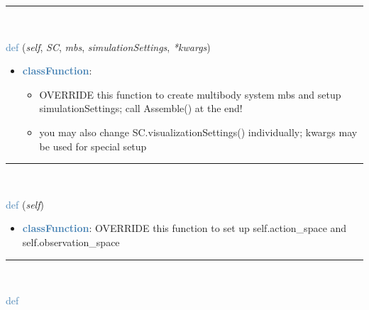 \begin{itemize}[leftmargin=1.4cm]
\begin{itemize}[leftmargin=1.4cm]
%
\noindent\rule{8cm}{0.75pt}\vspace{1pt} \\ 
\begin{flushleft}
\noindent \textcolor{steelblue}{def {\bf {}}}\label{sec:artificialIntelligence:OpenAIGymInterfaceEnv(Env):CreateMBS}
({\it self}, {\it SC}, {\it mbs}, {\it simulationSettings}, {\it **kwargs})
\end{flushleft}
\setlength{\itemindent}{0.7cm}
\begin{itemize}[leftmargin=0.7cm]
\item[--]\textcolor{steelblue}{\bf classFunction}: \vspace{-6pt}
\begin{itemize}[leftmargin=1.2cm]
\setlength{\itemindent}{-0.7cm}
\item[]OVERRIDE this function to create multibody system mbs and setup simulationSettings; call Assemble() at the end!
\item[]you may also change SC.visualizationSettings() individually; kwargs may be used for special setup
\end{itemize}
\vspace{12pt}\end{itemize}
%
\noindent\rule{8cm}{0.75pt}\vspace{1pt} \\ 
\begin{flushleft}
\noindent \textcolor{steelblue}{def {\bf {}}}\label{sec:artificialIntelligence:OpenAIGymInterfaceEnv(Env):SetupSpaces}
({\it self})
\end{flushleft}
\setlength{\itemindent}{0.7cm}
\begin{itemize}[leftmargin=0.7cm]
\item[--]\textcolor{steelblue}{\bf classFunction}: OVERRIDE this function to set up self.action_space and self.observation_space
\vspace{12pt}\end{itemize}
%
\noindent\rule{8cm}{0.75pt}\vspace{1pt} \\ 
\begin{flushleft}
\noindent \textcolor{steelblue}{def {\bf {}}}\label{sec:artificialIntelligence:OpenAIGymInterfaceEnv(Env):MapAction2MBS}

\end{flushleft}
\end{itemize}
\end{itemize}
